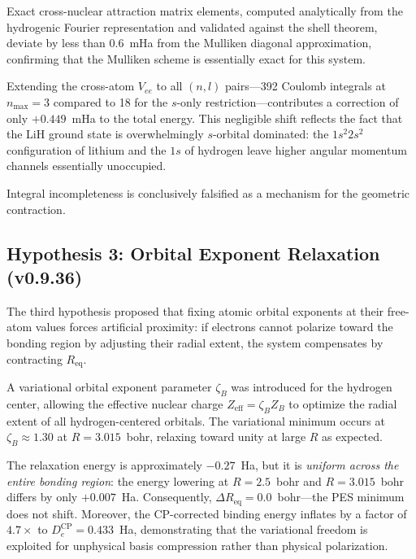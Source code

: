 \documentclass[aps,pra,twocolumn,superscriptaddress,longbibliography]{revtex4-2}
\begin{document}
Exact cross-nuclear attraction matrix elements, computed analytically
from the hydrogenic Fourier representation and validated against the
shell theorem, deviate by less than $0.6$~mHa from the Mulliken
diagonal approximation, confirming that the Mulliken scheme is
essentially exact for this system.

Extending the cross-atom $V_{ee}$ to all $(n,l)$ pairs---392 Coulomb
integrals at $n_{\max}=3$ compared to 18 for the $s$-only
restriction---contributes a correction of only $+0.449$~mHa to the
total energy.  This negligible shift reflects the fact that the LiH
ground state is overwhelmingly $s$-orbital dominated: the $1s^2 2s^2$
configuration of lithium and the $1s$ of hydrogen leave higher angular
momentum channels essentially unoccupied.

Integral incompleteness is conclusively falsified as a mechanism for the
geometric contraction.

\subsection{Hypothesis 3: Orbital Exponent Relaxation (v0.9.36)}
\label{sec:hyp_relaxation}

The third hypothesis proposed that fixing atomic orbital exponents at
their free-atom values forces artificial proximity: if electrons cannot
polarize toward the bonding region by adjusting their radial extent, the
system compensates by contracting $R_{\mathrm{eq}}$.

A variational orbital exponent parameter $\zeta_B$ was introduced for
the hydrogen center, allowing the effective nuclear charge
$Z_{\mathrm{eff}} = \zeta_B Z_B$ to optimize the radial extent of all
hydrogen-centered orbitals.  The variational minimum occurs at
$\zeta_B \approx 1.30$ at $R=3.015$~bohr, relaxing toward unity at
large $R$ as expected.

The relaxation energy is approximately $-0.27$~Ha, but it is
\emph{uniform across the entire bonding region}: the energy lowering at
$R=2.5$~bohr and $R=3.015$~bohr differs by only $+0.007$~Ha.
Consequently, $\Delta R_{\mathrm{eq}} = 0.0$~bohr---the PES minimum
does not shift.  Moreover, the CP-corrected binding energy inflates by a
factor of $4.7\times$ to $D_e^{\mathrm{CP}}=0.433$~Ha, demonstrating
that the variational freedom is exploited for unphysical basis
compression rather than physical polarization.
\end{document}
